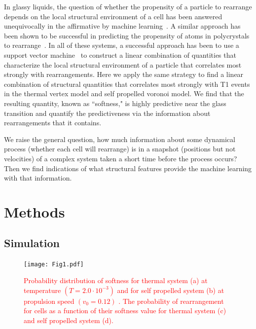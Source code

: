 \documentclass[twoside,twocolumn,9pt]{article}
\begin{document}
In glassy liquids, the question of whether the propensity of a particle to rearrange depends on the local structural environment of a cell has been answered unequivocally in the affirmative by machine learning~\cite{cubuk2015,schoenholz2016a,cubuk2016,schoenholz2016b,cubuk2017,sussman2017,landes2019}. A similar approach has been shown to be successful in predicting the propensity of atoms in polycrystals to rearrange~\cite{sharp2018}. In all of these systems, a successful approach has been to use a support vector machine~\cite{svm} to construct a linear combination of quantities that characterize the local structural environment of a particle that correlates most strongly with rearrangements. Here we apply the same strategy to find a linear combination of structural quantities that correlates most strongly with T1 events in the thermal vertex model and self propelled voronoi model. We find that the resulting quantity, known as ``softness," is highly predictive near the glass transition and quantify the predictiveness via the information about rearrangements that it contains.

We raise the general question, how much information about some dynamical process (whether each cell will rearrange) is in a snapshot (positions but not velocities) of a complex system taken a short time before the process occurs? Then we find indications of what structural features provide the machine learning with that information.

\section{Methods}
\subsection{Simulation}

\begin{figure}[h]
\centering
  \texttt{[image: Fig1.pdf]}
  \caption{\textcolor{red}{Probability distribution of softness for thermal system (a) at temperature $(T = 2.0 \cdot 10^{-3})$ and for self propelled system (b) at propulsion speed $(v_0 = 0.12)$ . The probability of rearrangement for cells  as a function of their softness
  value for thermal system (c) and self propelled  system (d).}}
  \label{CVM_softness}
\end{figure}
 
\end{document}
